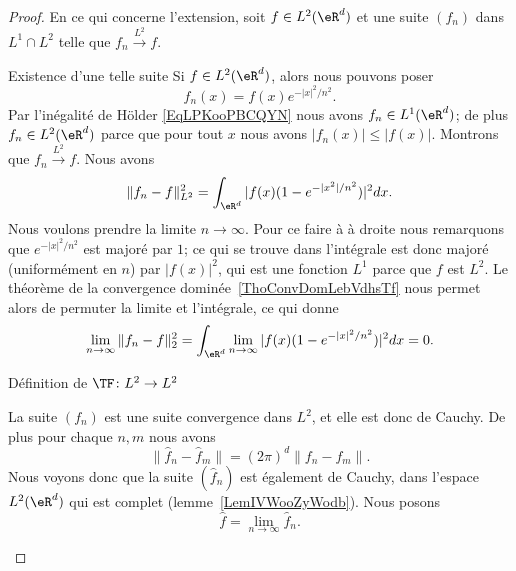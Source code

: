 \begin{proof}
    En ce qui concerne l'extension, soit \( f\in L^2(\eR^d)\) et une suite \( (f_n)\) dans \( L^1\cap L^2\) telle que \( f_n\stackrel{L^2}{\longrightarrow}f\).
    \begin{subproof}
        \item[Existence d'une telle suite]
            Si \( f\in L^2(\eR^d)\), alors nous pouvons poser
            \begin{equation}    \label{EQooHGJYooJsmxoX}
                f_n(x)=f(x) e^{-|x|^2/n^2}.
            \end{equation}
            Par l'inégalité de Hölder \eqref{EqLPKooPBCQYN} nous avons \( f_n\in L^1(\eR^d)\); de plus \( f_n\in L^2(\eR^d)\) parce que pour tout \( x\) nous avons \( | f_n(x) |\leq | f(x) |\). Montrons que \( f_n\stackrel{L^2}{\longrightarrow}f\). Nous avons
            \begin{equation}
                \| f_n-f \|_{L^2}^2=\int_{\eR^d}| f(x)(1- e^{-| x^2 |/n^2}) |^2dx.
            \end{equation}
            Nous voulons prendre la limite \( n\to \infty\). Pour ce faire à à droite nous remarquons que \(  e^{-| x |^2/n^2}\) est majoré par \( 1\); ce qui se trouve dans l'intégrale est donc majoré (uniformément en \( n\)) par \( | f(x) |^2\), qui est une fonction \( L^1\) parce que \( f\) est \( L^2\). Le théorème de la convergence dominée~\ref{ThoConvDomLebVdhsTf} nous permet alors de permuter la limite et l'intégrale, ce qui donne
            \begin{equation}
                \lim_{n\to \infty} \| f_n-f \|_2^2=\int_{\eR^d}\lim_{n\to \infty} | f(x)(1- e^{-| x |^2/n^2}) |^2dx=0.
            \end{equation}

        \item[Définition de \( \TF\colon L^2\to L^2\)]

            La suite \( (f_n)\) est une suite convergence dans \( L^2\), et elle est donc de Cauchy. De plus pour chaque \( n,m\) nous avons
            \begin{equation}
                \| \hat f_n-\hat f_m \|=(2\pi)^d\| f_n-f_m \|.
            \end{equation}
            Nous voyons donc que la suite \( (\hat f_n)\) est également de Cauchy, dans l'espace \( L^2(\eR^d)\) qui est complet (lemme~\ref{LemIVWooZyWodb}). Nous posons
            \begin{equation}
                \hat f=\lim_{n\to \infty} \hat f_n.
            \end{equation}


\end{subproof}
\end{proof}
